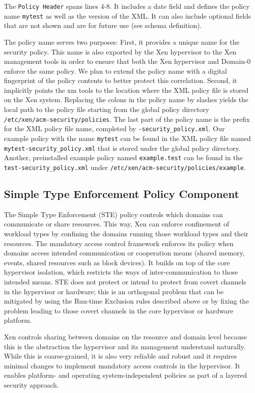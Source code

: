 \documentclass[11pt,twoside,final,openright]{report}
\begin{document}
The \verb|Policy Header| spans lines 4-8. It includes a date field and
defines the policy name \verb|mytest| as well
as the version of the XML. It can also include optional fields that are
not shown and are for future use (see schema definition).

The policy name serves two purposes: First, it provides a unique name
for the security policy. This name is also exported by the Xen
hypervisor to the Xen management tools in order to ensure that both
the Xen hypervisor and Domain-0 enforce the same policy.
We plan to extend the policy name with a
digital fingerprint of the policy contents to better protect this
correlation.  Second, it implicitly points the xm tools to the
location where the XML policy file is stored on the Xen system.
Replacing the colons in the policy name by slashes yields the local
path to the policy file starting from the global policy directory
\verb|/etc/xen/acm-security/policies|. The last part of the policy
name is the prefix for the XML policy file name, completed by
\verb|-security_policy.xml|. Our example policy with the name
\verb|mytest| can be found in the XML policy file named
\verb|mytest-security_policy.xml| that is stored under the global
policy directory. Another, preinstalled example policy named
\verb|example.test| can be found in the \verb|test-security_policy.xml|
under \verb|/etc/xen/acm-security/policies/example|.

\subsection{Simple Type Enforcement Policy Component}

The Simple Type Enforcement (STE) policy controls which domains can
communicate or share resources. This way, Xen can enforce confinement
of workload types by confining the domains running those workload
types and their resources. The mandatory access control framework
enforces its policy when
domains access intended communication or cooperation means (shared
memory, events, shared resources such as block devices). It builds on
top of the core hypervisor isolation, which restricts the ways of
inter-communication to those intended means.  STE does not protect or
intend to protect from covert channels in the hypervisor or hardware;
this is an orthogonal problem that can be mitigated by using the
Run-time Exclusion rules described above or by fixing the problem leading
to those covert channels in the core hypervisor or hardware platform.

Xen controls sharing between domains on the resource and domain level
because this is the abstraction the hypervisor and its management
understand naturally. While this is coarse-grained, it is also very
reliable and robust and it requires minimal changes to implement
mandatory access controls in the hypervisor. It enables platform- and
operating system-independent policies as part of a layered security
approach.
\end{document}
